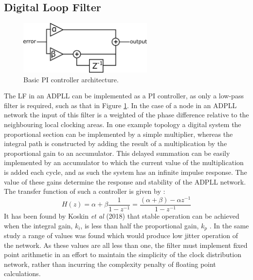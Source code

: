 \subsection{Digital Loop Filter}
\begin{figure}[h]
	\centering
	\includegraphics[width=0.6\textwidth]{../simple_pi}
	\caption[Basic \ac{PI} controller architecture]{Basic \ac{PI} controller architecture.}
	\label{fig:my_simple_pi}
\end{figure}%
The \acl{LF} in an \ac{ADPLL} can be implemented as a \ac{PI} controller, as only a low-pass filter is required, such as that in Figure \ref{fig:my_simple_pi}. In the case of a node in an \ac{ADPLL} network the input of this filter is a weighted of the phase difference relative to the neighbouring local clocking areas. In one example topology a digital system the proportional section can be implemented by a simple multiplier, whereas the integral path is constructed by adding the result of a multiplication by the proportional gain to an accumulator. This delayed summation can be easily implemented by an accumulator to which the current value of the multiplication is added each cycle, and as such the system has an infinite impulse response. The value of these gains determine the response and stability of the \ac{ADPLL} network. The transfer function of such a controller is given by \cite{shan2014phd}:
\begin{equation*}
	H(z) = \alpha + \beta\frac{1}{1-z^{-1}} = \frac{(\alpha + \beta) - \alpha z^{-1}}{1-z^{-1}}
\end{equation*}
It has been found by Koskin \textit{et al} (2018) that stable operation can be achieved when the integral gain, $k_i$, is less than half the proportional gain, $k_p$ \cite{koskin2018generation}. In the same study a range of values was found which would produce low jitter operation of the network. As these values are all less than one, the filter must implement fixed point arithmetic in an effort to maintain the simplicity of the clock distribution network, rather than incurring the complexity penalty of floating point calculations.

